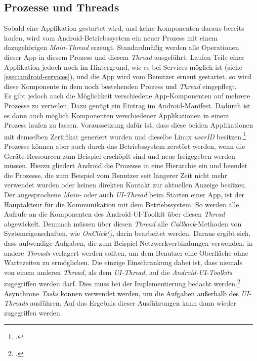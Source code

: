 \subsection{Prozesse und Threads}
\label{ssec:android-prozesse-threads}
Sobald eine Applikation gestartet wird, und keine Komponenten daraus bereits laufen, wird vom Android-Betriebssystem ein neuer Prozess mit einem dazugehörigen \textit{Main-Thread} erzeugt. Standardmäßig werden alle Operationen dieser App in diesem Prozess und diesem \textit{Thread} ausgeführt. Laufen Teile einer Applikation jedoch noch im Hintergrund, wie es bei Services möglich ist (siehe \ref{ssec:android-services}), und die App wird vom Benutzer erneut gestartet, so wird diese Komponente in dem noch bestehenden Prozess und \textit{Thread} eingepflegt.\\
Es gibt jedoch auch die Möglichkeit verschiedene App-Komponenten auf mehrere Prozesse zu verteilen. Dazu genügt ein Eintrag im Android-Manifest. Dadurch ist es dann auch möglich Komponenten verschiedener Applikationen in einem Prozess laufen zu lassen. Voraussetzung dafür ist, dass diese beiden Applikationen mit demselben Zertifikat generiert wurden und dieselbe Linux \textit{\gls{userID}} besitzen.\footcite{Android-ProcessesThreads}\\
Prozesse können aber auch durch das Betriebssystem zerstört werden, wenn die Geräte-Ressourcen zum Beispiel erschöpft sind und neue freigegeben werden müssen. Hierzu gliedert Android die Prozesse in eine Hierarchie ein und beendet die Prozesse, die zum Beispiel vom Benutzer seit längerer Zeit nicht mehr verwendet wurden oder keinen direkten Kontakt zur aktuellen Anzeige besitzen.\\
Der angesprochene \textit{Main-} oder auch \textit{UI-Thread} beim Starten einer App, ist der Hauptakteur für die Kommunikation mit dem Betriebssystem. So werden alle Aufrufe an die Komponenten des \gls{Android-UI-Toolkit} über diesen \textit{Thread} abgewickelt. Demnach müssen über diesen \textit{Thread} alle \textit{Callback}-Methoden von Systemeigenschaften, wie \textit{OnClick()}, darin bearbeitet werden. Daraus ergibt sich, dass aufwendige Aufgaben, die zum Beispiel Netzwerkverbindungen verwenden, in andere \textit{Threads} verlagert werden sollten, um dem Benutzer eine Oberfläche ohne Wartezeiten zu ermöglichen. Die einzige Einschränkung dabei ist, dass niemals von einem anderen \textit{Thread}, als dem \textit{UI-Thread}, auf die  \textit{\glspl{Android-UI-Toolkit}} zugegriffen werden darf. Dies muss bei der Implementierung bedacht werden.\footcite[S. 160f.]{Android-BeckerPant}\\
Asynchrone \textit{Tasks} können verwendet werden, um die Aufgaben außerhalb des \textit{UI-Threads} ausführen. Auf das Ergebnis dieser Ausführungen kann dann wieder zugegriffen werden.
